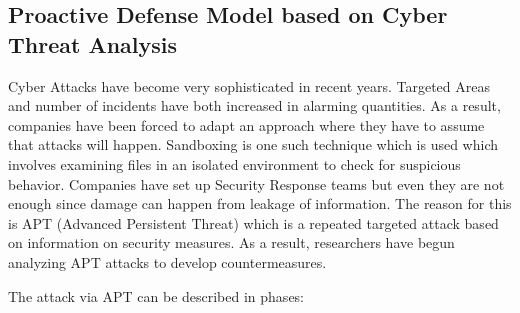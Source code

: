 \documentclass[11pt]{article}
\begin{document}
	\subsection{Proactive Defense Model based on Cyber Threat Analysis}
	
	Cyber Attacks have become very sophisticated in recent years. Targeted Areas and number of incidents have both increased in alarming quantities. As a result, companies have been forced to adapt an approach where they have to assume that attacks will happen. Sandboxing is one such technique which is used which involves examining files in an isolated environment to check for suspicious behavior. Companies have set up Security Response teams but even they are not enough since damage can happen from leakage of information. The reason for this is APT (Advanced Persistent Threat) which is a repeated targeted attack based on information on security measures. As a result, researchers have begun analyzing APT attacks to develop countermeasures. 
	
	The attack via APT can be described in phases:
	
\end{document}
